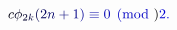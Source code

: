 \documentclass[12pt]{article}
\begin{document}
\makeatletter
\renewcommand*{\@textcolor}[3]{%
  \protect\leavevmode
  \begingroup
    \color#1{#2}#3%
  \endgroup
}
\makeatother
\begin{displaymath}
\mathcolor[RGB]{0,0,15}{c} \mathcolor[RGB]{0,0,30}{\phi} _ { \mathcolor[RGB]{0,0,45}{2} \mathcolor[RGB]{0,0,60}{k} } \mathcolor[RGB]{0,0,75}{(} \mathcolor[RGB]{0,0,90}{2} \mathcolor[RGB]{0,0,105}{n} \mathcolor[RGB]{0,0,120}{+} \mathcolor[RGB]{0,0,135}{1} \mathcolor[RGB]{0,0,150}{)} \mathcolor[RGB]{0,0,165}{\equiv} \mathcolor[RGB]{0,0,180}{0} \mathcolor[RGB]{0,0,195}{\pmod} { \mathcolor[RGB]{0,0,210}{2} } \mathcolor[RGB]{0,0,225}{.}
\end{displaymath}
\end{document}
